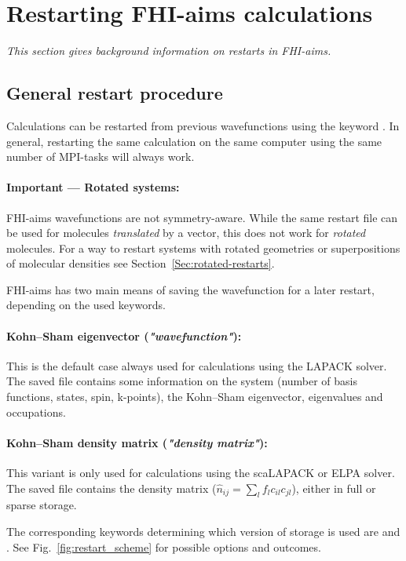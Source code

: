 \section{Restarting FHI-aims calculations}
\label{Sec:restarts}
\emph{This section gives background information on restarts in FHI-aims.}

\subsection{General restart procedure}
Calculations can be restarted from previous wavefunctions using the keyword
. In general, restarting the same calculation on the same
computer using the same number of MPI-tasks will always work.

\paragraph{Important --- Rotated systems:} FHI-aims wavefunctions are not
symmetry-aware. While the same restart file can be used for molecules
\emph{translated} by a vector, this does not work for \emph{rotated} molecules.
For a way to restart systems with rotated geometries or superpositions of
molecular densities see Section~\ref{Sec:rotated-restarts}.

FHI-aims has two main means of saving the wavefunction for a later restart,
depending on the used keywords.

\paragraph{Kohn--Sham eigenvector (\emph{"wavefunction"}):} This is the default
case always used for calculations using the LAPACK solver. The saved file
contains some information on the system (number of basis functions, states,
spin, k-points), the Kohn--Sham eigenvector, eigenvalues and occupations.

\paragraph{Kohn--Sham density matrix (\emph{"density matrix"}):} This variant is
only used for calculations using the scaLAPACK or ELPA solver. The saved file
contains the density matrix ($\hat{n}_{ij}=\sum_l f_l c_{il} c_{jl}$), either in
full or sparse storage.

The corresponding keywords determining which version of storage is used are
 and . See
Fig.~\ref{fig:restart_scheme} for possible options and outcomes.

